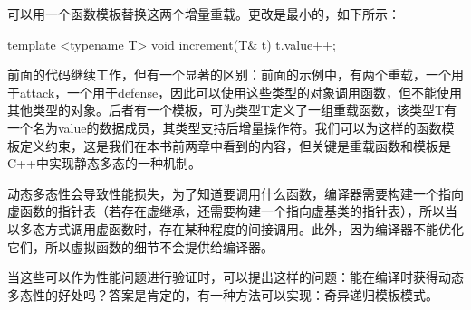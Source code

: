 可以用一个函数模板替换这两个增量重载。更改是最小的，如下所示：

\begin{cppcode}
template <typename T>
void increment(T& t) { t.value++; }
\end{cppcode}

前面的代码继续工作，但有一个显著的区别：前面的示例中，有两个重载，一个用于attack，一个用于defense，因此可以使用这些类型的对象调用函数，但不能使用其他类型的对象。后者有一个模板，可为类型T定义了一组重载函数，该类型T有一个名为value的数据成员，其类型支持后增量操作符。我们可以为这样的函数模板定义约束，这是我们在本书前两章中看到的内容，但关键是重载函数和模板是C++中实现静态多态的一种机制。

动态多态性会导致性能损失，为了知道要调用什么函数，编译器需要构建一个指向虚函数的指针表（若存在虚继承，还需要构建一个指向虚基类的指针表），所以当以多态方式调用虚函数时，存在某种程度的间接调用。此外，因为编译器不能优化它们，所以虚拟函数的细节不会提供给编译器。

当这些可以作为性能问题进行验证时，可以提出这样的问题：能在编译时获得动态多态性的好处吗？答案是肯定的，有一种方法可以实现：奇异递归模板模式。










































